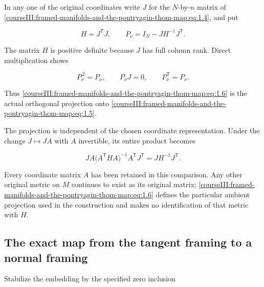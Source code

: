 In any one of the original coordinates write \(J\) for the \(N\)-by-\(n\) matrix of \eqref{courseIII:framed-manifolds-and-the-pontryagin-thom-map:eq:1.4}, and put

\begin{equation}
H=J^{\mathsf T}J,\qquad
 P_\nu=I_N-JH^{-1}J^{\mathsf T}.
 \label{courseIII:framed-manifolds-and-the-pontryagin-thom-map:eq:1.6}
\end{equation}

The matrix \(H\) is positive definite because \(J\) has full column rank. Direct multiplication shows

\begin{equation}
P_\nu^{\,2}=P_\nu,\qquad
 P_\nu J=0,\qquad
 P_\nu^{\mathsf T}=P_\nu.
 \label{courseIII:framed-manifolds-and-the-pontryagin-thom-map:eq:1.7}
\end{equation}

Thus \eqref{courseIII:framed-manifolds-and-the-pontryagin-thom-map:eq:1.6} is the actual orthogonal projection onto \eqref{courseIII:framed-manifolds-and-the-pontryagin-thom-map:eq:1.5}.

The projection is independent of the chosen coordinate representation. Under the change \(J\mapsto JA\) with \(A\) invertible, its entire product becomes

\begin{equation}
JA\bigl(A^{\mathsf T}HA\bigr)^{-1}A^{\mathsf T}J^{\mathsf T}
       =JH^{-1}J^{\mathsf T}.
 \label{courseIII:framed-manifolds-and-the-pontryagin-thom-map:eq:1.8}
\end{equation}

Every coordinate matrix \(A\) has been retained in this comparison. Any other original metric on \(M\) continues to exist as its original matrix; \eqref{courseIII:framed-manifolds-and-the-pontryagin-thom-map:eq:1.6} defines the particular ambient projection used in the construction and makes no identification of that metric with \(H\).

\label{courseIII:framed-manifolds-and-the-pontryagin-thom-map:pt-stable-normal-frame}

\subsection{The exact map from the tangent framing to a normal framing}
\label{courseIII:framed-manifolds-and-the-pontryagin-thom-map:section-2}

\label{courseIII:pontryagin-thom:2}

Stabilize the embedding by the specified zero inclusion

